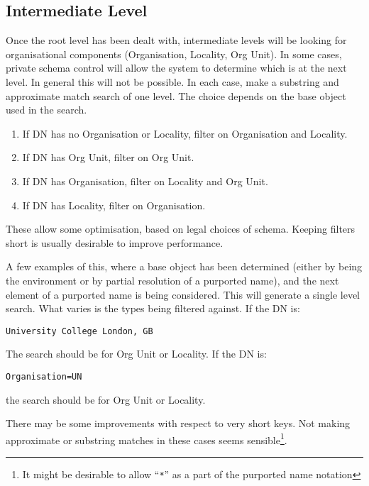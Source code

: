 \subsection {Intermediate Level}

Once the root level has been dealt with, intermediate levels will be looking
for organisational components (Organisation, Locality, Org Unit). 
In some cases, private schema control will allow the system to determine
which is at the next level.  In general this will not be possible.
In each case, make  a substring  and approximate match search of one level.
The choice depends on the base object used in the search.

\begin {enumerate}
\item If DN has no Organisation or Locality, filter on Organisation and
Locality. 
\item If DN has Org Unit, filter on Org Unit.
\item If DN has Organisation, filter on Locality and Org Unit.
\item If DN has Locality, filter on Organisation.
\end {enumerate}

These allow some optimisation, based on legal choices of schema.  Keeping
filters short is usually desirable to improve performance.   

A few examples of this, where a base object has been determined (either by
being the environment or by partial resolution of a purported name), and the
next element of a purported name is being considered.  This will generate a
single level search.  What varies is the types being filtered against.
If the DN is:

\begin{verbatim}
University College London, GB
\end{verbatim}

The search should be for Org Unit or Locality.  If the DN is:

\begin{verbatim}
Organisation=UN
\end{verbatim}

the search should be for Org Unit or Locality.

There may be some improvements with respect to very short keys.  Not making
approximate or substring matches in these cases seems sensible\footnote{It
might be desirable to allow ``\verb|*|'' as a part of the purported name
notation}.

